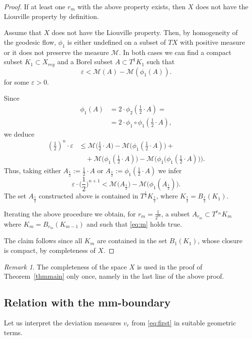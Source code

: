 \documentclass[12pt,leqno,intlimits]{amsart}
\numberwithin{equation}{section}
\theoremstyle{definition}
\theoremstyle{remark}
\newtheorem{rem}[thm]{Remark}
\newcommand{\tref}[1]{Theorem~\ref{#1}}
\begin{document}
\begin{proof}
If at least one $r_m$ with the above property exists, then $X$ does not have the Liouville property by definition.

{\color{red}

Assume that $X$ does not have the Liouville property.
Then, by homogeneity of the geodesic flow, $\phi _1$ is either undefined  on a subset of $TX$ with positive measure
or it does not preserve the measure $\mathcal M$.
In both cases we can find a compact subset $K_1\subset X_{reg}$ and a Borel subset $A\subset T^1 K_1$ such that 
\[\varepsilon < \mathcal M (A) - \mathcal M(\phi_1 (A)).\]
for some $\varepsilon >0$. 

}

Since 
\begin{align*}
\phi_1 (A)&=2\cdot \phi _2 (\tfrac 1 2 \cdot A )=
\\
&=2\cdot \phi _1 \circ \phi_1 (\tfrac 1 2\cdot  A ) ,
\end{align*}
we deduce
\begin{align*}
(\tfrac 1 2)^n \cdot \varepsilon &\leq \mathcal M \big(\tfrac 1 2\cdot A \big) - \mathcal M \big( \phi_1 (\tfrac 1 2\cdot A ) \big) +
\\
&\quad+\mathcal M \big(\phi_1 (\tfrac 1 2\cdot A )\big)
- \mathcal M\big (\phi_1 \big (\phi _1 (\tfrac 1 2\cdot A )\big) \big).
\end{align*}
Thus, taking either $A_{\frac 1 2} := \frac 1 2 \cdot A$ or $A_{\frac 1 2} := \phi_1 (\frac 1 2 \cdot A)$ we infer
$$\varepsilon \cdot \Big(\frac 1 2 \Big )^{n+1} < \mathcal M \big(A _{\frac 1 2} \big) - \mathcal M \big( \phi_1 (A _{\frac 1 2}) \big).$$
The set $A_{\frac 1 2}$ constructed above is contained in $T^{\frac 1 2} K_{\frac 1 2}$, where $K _{\frac 1 2} =B_{\frac 1 2} (K_1)$.

Iterating the above procedure we obtain, for $r_m =\frac 1 {2^m}$, a subset $A_{r_m} \subset T^{r_m} K_m$ where $K_m =B_{r_m} (K_{m-1})$ and such that \eqref{eq:m} holds true.

The claim follows since all $K_m$ are contained in the set $B_1 (K_1)$, whose closure is compact, by completeness of $X$.
\end{proof}

\begin{rem}
The completeness of the space $X$ is used in the proof of \tref{thmmain} only once, namely in the last line of the above proof.
\end{rem}

\subsection{Relation with the mm-boundary} Let us interpret the deviation measures $v_r$ from \eqref{eq:first} in suitable geometric terms.
\end{document}
